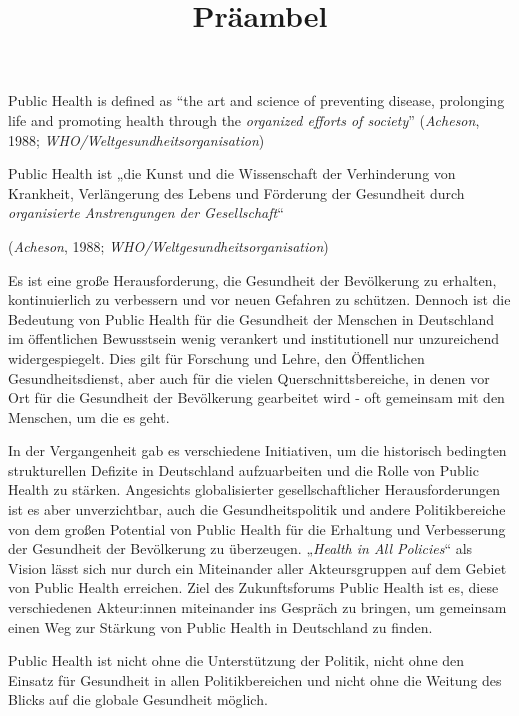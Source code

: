 \documentclass{article}
\begin{document}
\title{Präambel}

\maketitle


Public Health is defined as “the art and science of preventing disease, prolonging life and promoting health through the \emph{organized efforts of society}” (\emph{Acheson}, 1988; \emph{WHO/Weltgesundheitsorganisation})


Public Health ist „die Kunst und die Wissenschaft der Verhinderung von Krankheit, Verlängerung des Lebens und Förderung der Gesundheit durch \emph{organisierte Anstrengungen der Gesellschaft}“ 

(\emph{Acheson}, 1988; \emph{WHO/Weltgesundheitsorganisation})


Es ist eine große Herausforderung, die Gesundheit der Bevölkerung zu erhalten, kontinuierlich zu verbessern und vor neuen Gefahren zu schützen. Dennoch ist die Bedeutung von Public Health für die Gesundheit der Menschen in Deutschland im öffentlichen Bewusstsein wenig verankert und institutionell nur unzureichend widergespiegelt. Dies gilt für Forschung und Lehre, den Öffentlichen Gesundheitsdienst, aber auch für die vielen Querschnittsbereiche, in denen vor Ort für die Gesundheit der Bevölkerung gearbeitet wird - oft gemeinsam mit den Menschen, um die es geht.


In der Vergangenheit gab es verschiedene Initiativen, um die historisch bedingten strukturellen Defizite in Deutschland aufzuarbeiten und die Rolle von Public Health zu stärken. Angesichts globalisierter gesellschaftlicher Herausforderungen ist es aber unverzichtbar, auch die Gesundheitspolitik und andere Politikbereiche von dem großen Potential von Public Health für die Erhaltung und Verbesserung der Gesundheit der Bevölkerung zu überzeugen. „\emph{Health in All Policies}“ als Vision lässt sich nur durch ein Miteinander aller Akteursgruppen auf dem Gebiet von Public Health erreichen. Ziel des Zukunftsforums Public Health ist es, diese verschiedenen Akteur:innen miteinander ins Gespräch zu bringen, um gemeinsam einen Weg zur Stärkung von Public Health in Deutschland zu finden.


Public Health ist nicht ohne die Unterstützung der Politik, nicht ohne den Einsatz für Gesundheit in allen Politikbereichen und nicht ohne die Weitung des Blicks auf die globale Gesundheit möglich.
\end{document}
